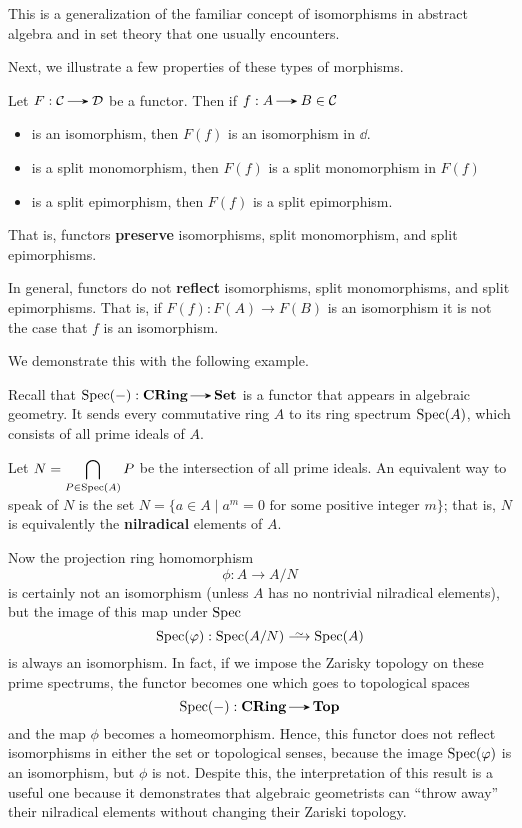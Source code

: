     This is a generalization of the familiar concept of isomorphisms
    in abstract algebra and in set theory that one usually encounters. 

    Next, we illustrate a few properties of these types of morphisms.
    \begin{proposition}
        Let $F: \cc \to \dd$ be a functor. Then 
        if $f: A \to B \in \cc$ 
        \begin{itemize}
            \item is an isomorphism, then 
            $F(f)$ is an isomorphism in $\dd$. 
            \item is a split monomorphism, then $F(f)$ 
            is a split monomorphism in $F(f)$  
            \item is a split epimorphism, then $F(f)$ is a split 
            epimorphism.
        \end{itemize}
        That is, functors \textbf{preserve} isomorphisms, split monomorphism, 
        and split epimorphisms. 
    \end{proposition}   
    In general, functors do not \textbf{reflect} isomorphisms, split monomorphisms, 
    and split epimorphisms. That is, if $F(f): F(A) \to F(B)$ is an isomorphism 
    it is not the case that $f$ is an isomorphism.
    
    We demonstrate this with the following example. 

    \begin{example}
        Recall that $\text{Spec}(-): \cring \to \Set$ is a functor 
        that appears in algebraic geometry. It sends every commutative ring $A$ to 
        its ring spectrum $\operatorname{\mathrm{Spec}}(A)$, which consists of all prime ideals of $A$.

        Let $\displaystyle N =\bigcap_{P \in \operatorname{\mathrm{Spec}}(A)}P$ be the intersection of all prime ideals.
        An equivalent way to speak of $N$ 
        is the set $N = \{a \in A \mid a^m =0 \text{ for some positive integer }m\}$; 
        that is, $N$ is equivalently the \textbf{nilradical} elements of $A$.

        Now the projection ring homomorphism 
        \[
            \phi: A \to A/N
        \]
        is certainly not an isomorphism (unless $A$ has no nontrivial 
        nilradical elements), but the image of this map under $\operatorname{\mathrm{Spec}}$ 
        \[
            \spec(\phi): \spec(A/N) \isomarrow \spec(A)
        \] 
        is always an isomorphism. In fact, if we impose the Zarisky topology on these prime spectrums, 
        the functor becomes one which goes to topological spaces
        \[
            \text{Spec}(-): \cring \to \top
        \]
        and the map $\phi$ becomes a homeomorphism. Hence, this functor does not reflect isomorphisms 
        in either the set or topological senses, because the image $\operatorname{\mathrm{Spec}}(\varphi)$ 
        is an isomorphism, but $\phi$ is not.  
        Despite this,  
        the interpretation of this result is a useful one because it demonstrates that algebraic 
        geometrists can ``throw away'' their nilradical elements without changing 
        their Zariski topology.
    \end{example}




